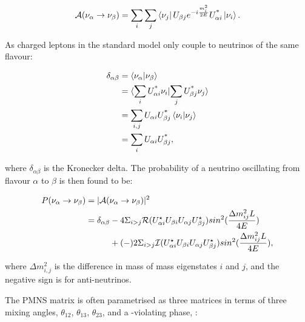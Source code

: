 \begin{equation}
\mathcal{A}(\nu_\alpha \rightarrow \nu_\beta) = \sum_i \sum_j \bra{\nu_j}U_{\beta j}e^{-i\frac{m_i^2}{2E}}U^{\text{*}}_{\alpha i}\ket{\nu_i}.
\end{equation}

As charged leptons in the standard model only couple to neutrinos of the same flavour:

 \begin{equation}
 \begin{aligned}
\delta_{\alpha\beta} &= \bra{\nu_\alpha}\ket{\nu_\beta}\\
&= \langle\sum_i U^{\text{*}}_{\alpha i}\nu_i}|{\sum_j U^{\text{*}}_{\beta j}\nu_j\rangle\\
&= \sum_{i,j}U_{\alpha i}U^{\text{*}}_{\beta j}\bra{\nu_i}\ket{\nu_j}\\
&=\sum_i U_{\alpha i}U^{\text{*}}_{\beta j},
 \end{aligned}
\end{equation}

where $\delta_{\alpha\beta}$ is the Kronecker delta. The probability of a neutrino oscillating from flavour $\alpha$ to $\beta$ is then found to be:

\begin{equation}
\begin{aligned}
P(\nu_\alpha \rightarrow \nu_\beta) &= |\mathcal{A}(\nu_\alpha \rightarrow \nu_\beta)|^2 \\
&= \delta_{\alpha\beta} - 4 \Sigma_{i>j}\mathcal{R}(U_{\alpha i}^\star U_{\beta i} U_{\alpha j} U_{\beta j}^\star) sin^2 (\frac{\Delta m^2_{ij}L}{4E})\\ 
&\hphantom{= \delta_{\alpha\beta}.}+(-) 2 \Sigma_{i>j}\mathcal{I}(U_{\alpha i}^\star U_{\beta i} U_{\alpha j} U_{\beta j}^\star) sin^2 (\frac{\Delta m^2_{ij}L}{4E}),
\end{aligned}
\label{eqn:oscprob}
\end{equation}

where $\Delta m^{2}_{i,j}$ is the difference in mass of mass eigenstates $i$ and $j$, and the negative sign is for anti-neutrinos.

The PMNS matrix is often parametrised as three matrices in terms of three mixing angles, $\theta_{12}$, $\theta_{13}$, $\theta_{23}$, and a \CP-violating phase, \deltacp:

